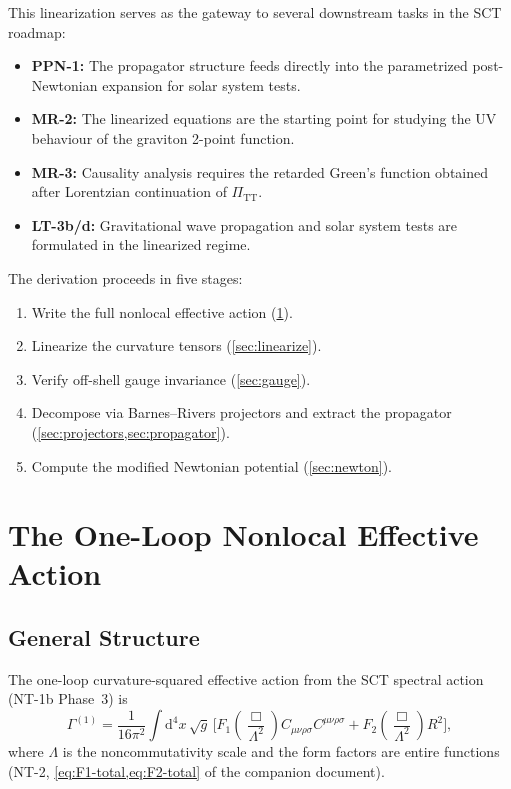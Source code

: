 \documentclass[11pt,a4paper]{article}
\newcommand{\Weylsq}{C_{\mu\nu\rho\sigma}C^{\mu\nu\rho\sigma}}
\renewcommand{\dd}{\mathrm{d}}
\theoremstyle{plain}
\theoremstyle{definition}
\begin{document}
This linearization serves as the gateway to several downstream tasks
in the SCT roadmap:
\begin{itemize}[nosep]
  \item \textbf{PPN-1:} The propagator structure feeds directly into
    the parametrized post-Newtonian expansion for solar system tests.
  \item \textbf{MR-2:} The linearized equations are the starting point
    for studying the UV behaviour of the graviton 2-point function.
  \item \textbf{MR-3:} Causality analysis requires the retarded Green's
    function obtained after Lorentzian continuation of
    $\Pi_{\mathrm{TT}}$.
  \item \textbf{LT-3b/d:} Gravitational wave propagation and solar
    system tests are formulated in the linearized regime.
\end{itemize}

The derivation proceeds in five stages:
\begin{enumerate}[nosep]
  \item Write the full nonlocal effective action (\cref{sec:action}).
  \item Linearize the curvature tensors (\cref{sec:linearize}).
  \item Verify off-shell gauge invariance (\cref{sec:gauge}).
  \item Decompose via Barnes--Rivers projectors and extract the
    propagator (\cref{sec:projectors,sec:propagator}).
  \item Compute the modified Newtonian potential (\cref{sec:newton}).
\end{enumerate}

\section{The One-Loop Nonlocal Effective Action}\label{sec:action}

\subsection{General Structure}

The one-loop curvature-squared effective action from the SCT spectral
action (NT-1b Phase~3) is
\begin{equation}\label{eq:Gamma-full}
  \Gamma^{(1)} = \frac{1}{16\pi^2} \int \dd^4 x\,\sqrt{g}\,
  \Big[F_1\!\left(\frac{\Box}{\Lambda^2}\right) \Weylsq
  + F_2\!\left(\frac{\Box}{\Lambda^2}\right) R^2\Big],
\end{equation}
where $\Lambda$ is the noncommutativity scale and the form factors
are entire functions (NT-2, \cref{eq:F1-total,eq:F2-total} of the
companion document).
\end{document}
